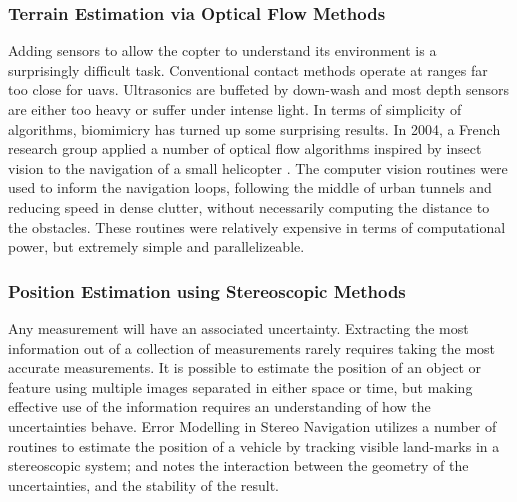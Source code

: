 \documentclass[a4paper, 11pt, titlepage]{article}
\begin{document}
      \subsubsection{Terrain Estimation via Optical Flow Methods}
        Adding sensors to allow the copter to understand its environment is a surprisingly difficult task.  Conventional contact methods operate at ranges far too close for \glspl{uav}. Ultrasonics are buffeted by down-wash and most depth sensors are either too heavy or suffer under intense light.
        In terms of simplicity of algorithms, biomimicry has turned up some surprising results.  In 2004, a French research group applied a number of optical flow algorithms inspired by insect vision to the navigation of a small helicopter \cite{InsectFlowMethods}.  The computer vision routines were used to inform the navigation loops, following the middle of urban tunnels and reducing speed in dense clutter, without necessarily computing the distance to the obstacles.  These routines were relatively expensive in terms of computational power, but extremely simple and parallelizeable.

      \subsubsection{Position Estimation using Stereoscopic Methods}
        Any measurement will have an associated uncertainty. Extracting the most information out of a collection of measurements rarely requires taking the most accurate measurements.  It is possible to estimate the position of an object or feature using multiple images separated in either space or time, but making effective use of the information requires an understanding of how the uncertainties behave.  Error Modelling in Stereo Navigation \cite{stereoUnc} utilizes a number of routines to estimate the position of a vehicle by tracking visible land-marks in a stereoscopic system; and notes the interaction between the geometry of the uncertainties, and the stability of the result.
\end{document}
